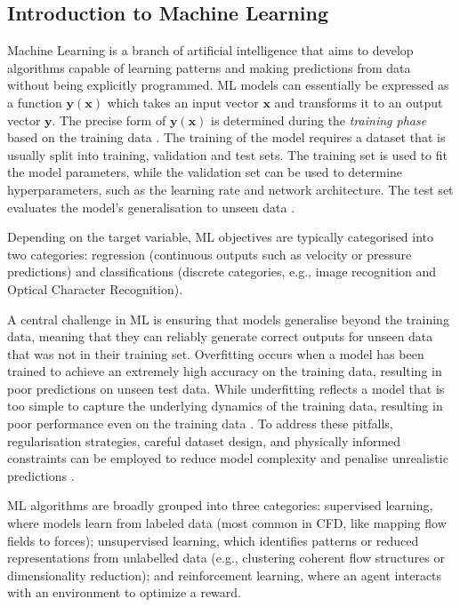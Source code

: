 \subsection{Introduction to Machine Learning}
\label{subsect: intro to ML}
Machine Learning is a branch of artificial intelligence that aims to develop algorithms capable of learning patterns and making predictions from data without being explicitly programmed. ML models can essentially be expressed as a function $\boldsymbol{y}(\boldsymbol{x})$ which takes an input vector $\boldsymbol{x}$ and transforms it to an output vector $\boldsymbol{y}$. The precise form of $\boldsymbol{y}(\boldsymbol{x})$ is determined during the \textit{training phase} based on the training data \cite{bishop2007}. The training of the model requires a dataset that is usually split into training, validation and test sets. The training set is used to fit the model parameters, while the validation set can be used to determine hyperparameters, such as the learning rate and network architecture. The test set evaluates the model's generalisation to unseen data \cite{burkov2020}. 

Depending on the target variable, ML objectives are typically categorised into two categories: regression (continuous outputs such as velocity or pressure predictions) and classifications (discrete categories, e.g., image recognition and Optical Character Recognition).

A central challenge in ML is ensuring that models generalise beyond the training data, meaning that they can reliably generate correct outputs for unseen data that was not in their training set. Overfitting occurs when a model has been trained to achieve an extremely high accuracy on the training data, resulting in poor predictions on unseen test data. While underfitting reflects a model that is too simple to capture the underlying dynamics of the training data, resulting in poor performance even on the training data \cite{burkov2020}. To address these pitfalls, regularisation strategies, careful dataset design, and physically informed constraints can be employed to reduce model complexity and penalise unrealistic predictions \cite{Aggarwal2018, sanderse2024}.

ML algorithms are broadly grouped into three categories: supervised learning, where models learn from labeled data (most common in CFD, like mapping flow fields to forces); unsupervised learning, which identifies patterns or reduced representations from unlabelled data (e.g., clustering coherent flow structures or dimensionality reduction); and reinforcement learning, where an agent interacts with an environment to optimize a reward. 

